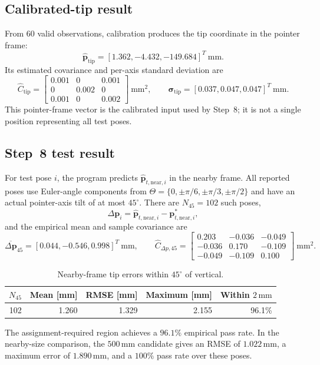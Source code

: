 \documentclass[11pt]{article}
\newcommand{\vct}[1]{\bm{#1}}
\begin{document}
\subsection{Calibrated-tip result}
From 60 valid observations, calibration produces the tip coordinate in the
pointer frame:
\begin{equation}
\widehat{\vct p}_{\mathrm{tip}}
=[1.362,-4.432,-149.684]^T\ \mathrm{mm}.
\end{equation}
Its estimated covariance and per-axis standard deviation are
\begin{equation}
\widehat C_{\mathrm{tip}}
=\begin{bmatrix}
0.001&0&0.001\\
0&0.002&0\\
0.001&0&0.002
\end{bmatrix}\ \mathrm{mm}^2,
\qquad
\vct{\sigma}_{\mathrm{tip}}
=[0.037,0.047,0.047]^T\ \mathrm{mm}.
\end{equation}
This pointer-frame vector is the calibrated input used by Step~8; it is not a
single position representing all test poses.

\subsection{Step~8 test result}
For test pose $i$, the program predicts
$\widehat{\vct p}_{t,\mathrm{near},i}$ in the nearby frame.  All reported poses use Euler-angle components from
$\Theta=\{0,\pm\pi/6,\pm\pi/3,\pm\pi/2\}$ and have an actual
pointer-axis tilt of at most $45^\circ$.  There are $N_{45}=102$ such poses,
\begin{equation}
\Delta\vct p_i
=\widehat{\vct p}_{t,\mathrm{near},i}
-\vct p_{t,\mathrm{near},i}^*,
\end{equation}
and the empirical mean and sample covariance are
\begin{equation}
\overline{\Delta\vct p}_{45}
=[0.044,-0.546,0.998]^T\ \mathrm{mm},
\qquad
\widehat C_{\Delta p,45}
=\begin{bmatrix}
0.203&-0.036&-0.049\\
-0.036&0.170&-0.109\\
-0.049&-0.109&0.100
\end{bmatrix}\ \mathrm{mm}^2.
\end{equation}

\begin{table}[H]
\centering
\small
\caption{Nearby-frame tip errors within $45^\circ$ of vertical.}
\label{tab:result-summary}
\begin{tabular}{rrrrr}
\toprule
$N_{45}$ & Mean [mm] & RMSE [mm] & Maximum [mm] & Within $2\,\mathrm{mm}$ \\
\midrule
102 & 1.260 & 1.329 & 2.155 & 96.1\% \\
\bottomrule
\end{tabular}
\end{table}
The assignment-required region achieves a $96.1\%$ empirical pass rate.  In
the nearby-size comparison, the $500\,\mathrm{mm}$ candidate gives an RMSE
of $1.022\,\mathrm{mm}$, a maximum error of $1.890\,\mathrm{mm}$, and a
$100\%$ pass rate over these poses.
\end{document}
